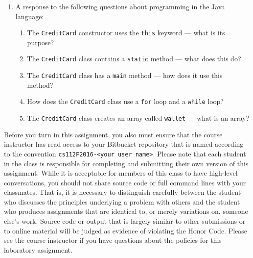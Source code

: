 \begin{enumerate}
\begin{enumerate}
      \item A response to the following questions about programming in the Java language:

        \begin{enumerate}
          \itemsep 0em

          \item The {\tt CreditCard} constructor uses the {\tt this} keyword --- what is its purpose?

          \item The {\tt CreditCard} class contains a {\tt static} method --- what does this do?

          \item The {\tt CreditCard} class has a {\tt main} method --- how does it use this method?

          \item How does the {\tt CreditCard} class use a {\tt for} loop and a {\tt while} loop?

          \item The {\tt CreditCard} class creates an array called {\tt wallet} --- what is an array?

        \end{enumerate}

    \end{enumerate}

\end{enumerate}

\vspace*{-.05in}

Before you turn in this assignment, you also must ensure that the course instructor has read access to your Bitbucket
repository that is named according to the convention {\tt cs112F2016-<your user name>}. Please note that each student in
the class is responsible for completing and submitting their own version of this assignment. While it is acceptable for
members of this class to have high-level conversations, you should not share source code or full command lines with your
classmates.  That is, it is necessary to distinguish carefully between the student who discusses the principles
underlying a problem with others and the student who produces assignments that are identical to, or merely variations
on, someone else's work.  Source code or output that is largely similar to other submissions or to online material will
be judged as evidence of violating the Honor Code. Please see the course instructor if you have questions about the
policies for this laboratory assignment.


